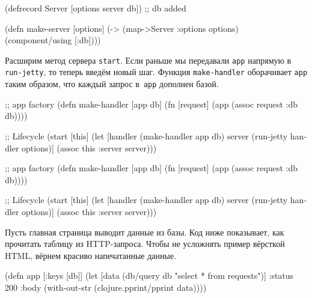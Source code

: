 \begin{english}
  \begin{clojure}
(defrecord Server
  [options server db]) ;; db added

(defn make-server
  [options]
  (-> (map->Server {:options options})
      (component/using [:db])))
  \end{clojure}
\end{english}

Расширим метод сервера \verb|start|. Если раньше мы передавали \verb|app|
напрямую в \verb|run-jetty|, то теперь введём новый шаг. Функция
\texttt{make\--hand\-ler} оборачивает \verb|app| таким образом, что каждый запрос
в~\verb|app| дополнен базой.

\ifx\DEVICETYPE\MOBILE

\begin{english}
  \begin{clojure}
;; app factory
(defn make-handler [app db]
  (fn [request]
    (app (assoc request :db db))))

;; Lifecycle
(start [this]
  (let [handler (make-handler app db)
        server (run-jetty handler
                 options)]
    (assoc this :server server)))
  \end{clojure}
\end{english}

\else

\begin{english}
  \begin{clojure}
;; app factory
(defn make-handler [app db]
  (fn [request]
    (app (assoc request :db db))))

;; Lifecycle
(start [this]
  (let [handler (make-handler app db)
        server (run-jetty handler options)]
    (assoc this :server server)))
  \end{clojure}
\end{english}

\fi

Пусть главная страница выводит данные из базы. Код ниже показывает, как
прочитать таблицу из HTTP-запроса. Чтобы не усложнять пример вёрсткой HTML,
вёрнем красиво напечатанные данные.

\ifx\DEVICETYPE\MOBILE

\begin{english}
  \begin{clojure}
(defn app [{:keys [db]}]
  (let [data (db/query db
               "select * from requests")]
    {:status 200
     :body (with-out-str
             (clojure.pprint/pprint
               data))}))
  \end{clojure}
\end{english}

